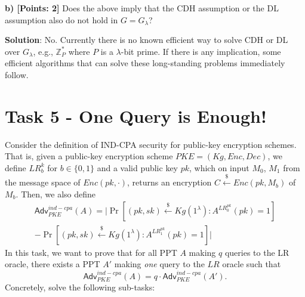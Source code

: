 \documentclass[12pt]{article}
\newcommand{\Z}{\mathbb{Z}}
\newcommand{\bits}{\{0,1\}}
\newcommand{\getsr}{\stackrel{\$}{\gets}}
\newcommand{\Adv}{\textsf{Adv}}
\theoremstyle{definition}
\begin{document}
{\bf b) [Points: 2]} Does the above imply that the CDH assumption or the DL assumption also do not hold in $G = G_\lambda$?

{\bf Solution}: No. Currently there is no known efficient way to solve CDH or DL over $G_\lambda$, e.g., $\Z_P^*$ where $P$ is a $\lambda$-bit prime. If there is any implication, some efficient algorithms that can solve these long-standing problems immediately follow.

\section{Task 5 - One Query is Enough!}
Consider the definition of IND-CPA security for public-key encryption schemes. That is,
given a public-key encryption scheme $PKE = (Kg, Enc, Dec)$, we define $LR_b^k$ for $b\in\bits$ and a valid public key $pk$, which on input $M_0$, $M_1$ from the message space of $Enc(pk,\cdot)$, returns an encryption $C \getsr Enc(pk, M_b)$ of $M_b$. Then, we also define
$$\begin{aligned}
\Adv_{PKE}^{ind-cpa}(A) = \bigg| \Pr[(pk,sk)\getsr Kg(1^\lambda) : A^{LR_0^{pk}}(pk)=1] \\
-\Pr[(pk,sk)\getsr Kg(1^\lambda) : A^{LR_1^{pk}}(pk)=1] \bigg|
\end{aligned}$$
In this task, we want to prove that for all PPT $A$ making $q$ queries to the LR oracle, there exists a PPT $A'$ making \emph{one} query to the $LR$ oracle such that
\begin{equation}
\label{eq:1}
\Adv_{PKE}^{ind-cpa}(A) = q \cdot \Adv_{PKE}^{ind-cpa}(A').
\end{equation}
Concretely, solve the following sub-tasks:
\end{document}
